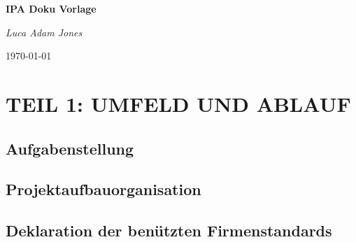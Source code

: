 \documentclass{report}
\begin{document}
\begin{titlepage}
    \centering
    \vspace*{2cm}
    {\huge\bfseries IPA Doku Vorlage \par}
    \vspace{1.5cm}
    {\Large\itshape Luca Adam Jones\par}
    \vfill
    {\large\today\par}
    \vfill
\end{titlepage}

\tableofcontents

\chapter{TEIL 1: UMFELD UND ABLAUF}

\section{Aufgabenstellung}

\section{Projektaufbauorganisation}


\section{Deklaration der benützten Firmenstandards}

\end{document}
